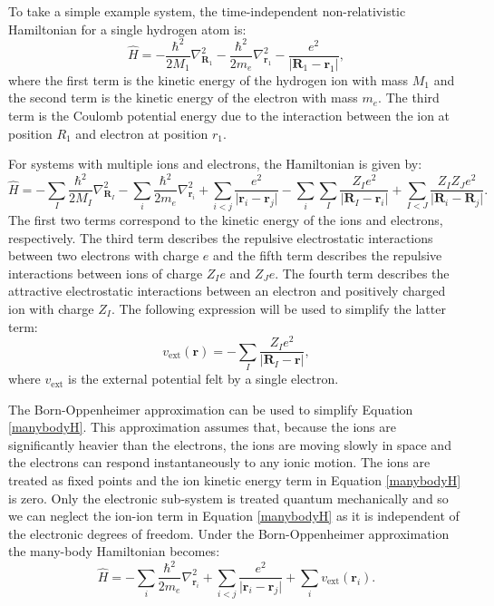 To take a simple example system, the time-independent non-relativistic Hamiltonian for a single hydrogen atom is:
\begin{equation} \label{singleparticle}
\hat{H} = -\frac{\hbar^2}{2M_1}\nabla_{\textbf{R}_1}^2-\frac{\hbar^2}{2m_e}\nabla_{\textbf{r}_1}^2-\frac{e^2}{\lvert\textbf{R}_1-\textbf{r}_1\rvert},
\end{equation}
where the first term is the kinetic energy of the hydrogen ion with mass $M_1$ and the second term is the kinetic energy of the electron with mass $m_e$. The third term is the Coulomb potential energy due to the interaction between the ion at position $R_1$ and electron at position $r_1$. 

For systems with multiple ions and electrons, the Hamiltonian is given by:\autocite{Kaxiras2007}
\begin{equation} \label{manybodyH}
\hat{H} = -\sum_{I}\frac{\hbar^2}{2M_I}\nabla_{\textbf{R}_I}^2-\sum_{i}\frac{\hbar^2}{2m_e}\nabla_{\textbf{r}_i}^2 +\sum_{i<j}\frac{e^2}{\lvert\textbf{r}_i-\textbf{r}_j\rvert}-\sum_{i}\sum_{I}\frac{Z_Ie^2}{\lvert\textbf{R}_I-\textbf{r}_i\rvert}+\sum_{I<J}\frac{Z_IZ_Je^2}{\lvert\textbf{R}_i-\textbf{R}_j\rvert}.
\end{equation}
The first two terms correspond to the kinetic energy of the ions and electrons, respectively. The third term describes the repulsive electrostatic interactions between two electrons with charge $e$ and the fifth term describes the repulsive interactions between ions of charge $Z_Ie$ and $Z_Je$. The fourth term describes the attractive electrostatic interactions between an electron and positively charged ion with charge $Z_I$. The following expression will be used to simplify the latter term:
\begin{equation}
v_\textrm{ext}(\textbf{r}) = -\sum_I\frac{Z_Ie^2}{\lvert\textbf{R}_I-\textbf{r}\rvert},
\end{equation}
where $v_\textrm{ext}$ is the external potential felt by a single electron. 

The Born-Oppenheimer approximation can be used to simplify Equation \ref{manybodyH}.\autocite{Born1927} This approximation assumes that, because the ions are significantly heavier than the electrons, the ions are moving slowly in space and the electrons can respond instantaneously to any ionic motion. The ions are treated as fixed points and the ion kinetic energy term in Equation \ref{manybodyH} is zero. Only the electronic sub-system is treated quantum mechanically and so we can neglect the ion-ion term in Equation \ref{manybodyH} as it is independent of the electronic degrees of freedom.
Under the Born-Oppenheimer approximation the many-body Hamiltonian becomes:\autocite{Kaxiras2007}
\begin{equation}
\hat{H} = -\sum_{i}\frac{\hbar^2}{2m_e}\nabla_{\textbf{r}_i}^2 +\sum_{i<j}\frac{e^2}{\lvert\textbf{r}_i-\textbf{r}_j\rvert}+\sum_{i}v_\textrm{ext}(\textbf{r}_i).
\end{equation}



